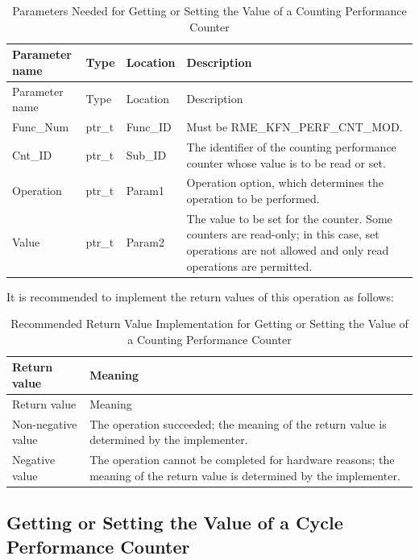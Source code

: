 \begin{xltabular}{\textwidth}{@{}>{\hsize\raggedright\arraybackslash}X>{\hsize\raggedright\arraybackslash}X>{\hsize\raggedright\arraybackslash}X>{\hsize\raggedright\arraybackslash}X@{}}
\caption{Parameters Needed for Getting or Setting the Value of a Counting Performance Counter}\label{tab:8-62-get-or-set-count-performance-counter-parameters}\\
\toprule
Parameter name & Type & Location & Description\tabularnewline
\endfirsthead
\toprule
Parameter name & Type & Location & Description\tabularnewline
\midrule
\endhead
\bottomrule
\endlastfoot
Func\_Num & ptr\_t & Func\_ID & Must be RME\_KFN\_PERF\_CNT\_MOD.\tabularnewline
Cnt\_ID & ptr\_t & Sub\_ID &
The identifier of the counting performance counter whose value is to be read or set.\tabularnewline
Operation & ptr\_t & Param1 &
Operation option, which determines the operation to be performed.\tabularnewline
Value & ptr\_t & Param2 &
The value to be set for the counter. Some counters are read-only; in this case, set operations are not allowed and only read operations are permitted.\tabularnewline
\end{xltabular}
\nopagebreak[4]

It is recommended to implement the return values of this operation as follows:

\begin{xltabular}{\textwidth}{@{}>{\hsize\raggedright\arraybackslash}X>{\hsize\raggedright\arraybackslash}X@{}}
\caption{Recommended Return Value Implementation for Getting or Setting the Value of a Counting Performance Counter}\label{tab:8-63-get-or-set-count-performance-counter-suggested-return-values}\\
\toprule
Return value & Meaning\tabularnewline
\endfirsthead
\toprule
Return value & Meaning\tabularnewline
\midrule
\endhead
\bottomrule
\endlastfoot
    Non-negative value & The operation succeeded; the meaning of the return value is determined by the implementer.\tabularnewline
    Negative value & The operation cannot be completed for hardware reasons; the meaning of the return value is determined by the implementer.\tabularnewline
\end{xltabular}
\nopagebreak[4]

\subsection{Getting or Setting the Value of a Cycle Performance Counter}\label{subsec:8-get-or-set-cycle-performance-counter}

